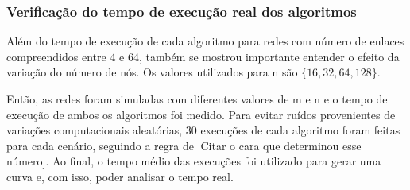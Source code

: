 \subsubsection{Verificação do tempo de execução real dos algoritmos}

Além do tempo de execução de cada algoritmo para redes com número de enlaces compreendidos entre 4 e 64, também se mostrou importante entender o efeito da variação do número de nós. Os valores utilizados para n são $\{16, 32, 64, 128\}$. 

Então, as redes foram simuladas com diferentes valores de m e n e o tempo de execução de ambos os algoritmos foi medido. Para evitar ruídos provenientes de variações computacionais aleatórias, 30 execuções de cada algoritmo foram feitas para cada cenário, seguindo a regra de [Citar o cara que determinou esse número]. Ao final, o tempo médio das execuções foi utilizado para gerar uma curva e, com isso, poder analisar o tempo real.

